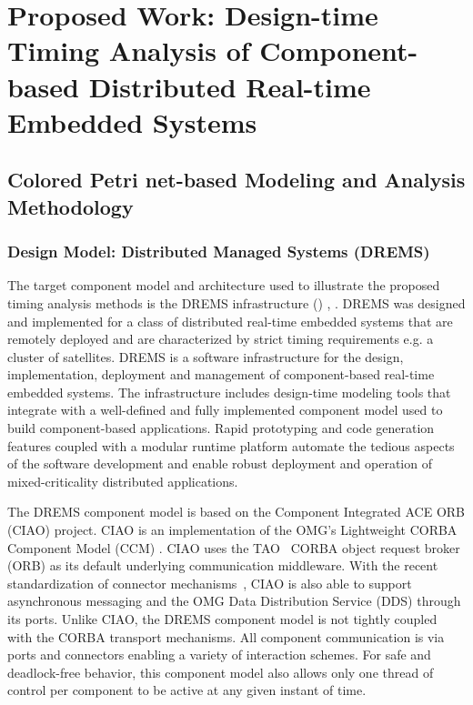 \chapter{Proposed Work: Design-time Timing Analysis of Component-based Distributed Real-time Embedded Systems}

\section{Colored Petri net-based Modeling and Analysis Methodology}

\subsection{Design Model: Distributed Managed Systems (DREMS)}

The target component model and architecture used to illustrate the proposed timing analysis methods is the DREMS infrastructure (\iapfull) \cite{DREMS13Software}, \cite{ISIS_F6_ISORC:13}. DREMS was designed and implemented for a class of distributed real-time embedded systems that are remotely deployed and are characterized by strict timing requirements e.g. a cluster of satellites. DREMS is a software infrastructure for the design, implementation, deployment and management of component-based real-time embedded systems. The infrastructure includes design-time modeling tools \cite{ISIS_F6_SFFMT:13} that integrate with a well-defined and fully implemented component model \cite{ISIS_F6_ISORC:13, kumar2014colored} used to build component-based applications. Rapid prototyping and code generation features coupled with a modular runtime platform automate the tedious aspects of the software development and enable robust deployment and operation of mixed-criticality distributed applications.

The DREMS component model is based on the Component Integrated ACE ORB (CIAO) \cite{RT_CIAO:04, CIAO_Chap:04} project. CIAO is an implementation of the OMG's Lightweight CORBA Component Model (CCM) \cite{CCM-light:03}. CIAO uses the
TAO~\cite{TAO:02} CORBA object request broker (ORB) as its default underlying
communication middleware.  With the recent standardization of connector mechanisms~\cite{dds4ccm:09}, CIAO is also able to support asynchronous messaging and the OMG Data Distribution Service (DDS) through its ports. Unlike CIAO, the DREMS component model is not tightly coupled with the CORBA transport mechanisms. All component communication is via ports and connectors \cite{Connectors} enabling a variety of interaction schemes. For safe and deadlock-free behavior, this component model also allows only one thread of control per component to be active at any given instant of time. 

